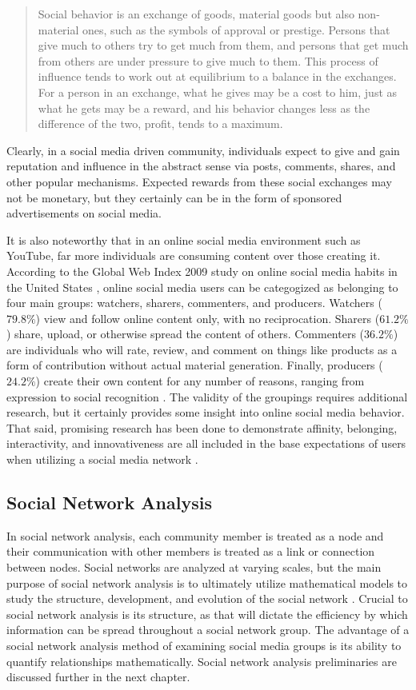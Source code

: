 \begin{quote}
Social behavior is an exchange of goods, material goods but also non-material ones, such as the symbols of approval or prestige. Persons that give much to others try to get much from them, and persons that get much from others are under pressure to give much to them. This process of influence tends to work out at equilibrium to a balance in the exchanges. For a person in an exchange, what he gives may be a cost to him, just as what he gets may be a reward, and his behavior changes less as the difference of the two, profit, tends to a maximum.  \cite{homans1958social}
\end{quote}

Clearly, in a social media driven community, individuals expect to give and gain reputation and influence in the abstract sense via posts, comments, shares, and other popular mechanisms. Expected rewards from these social exchanges may not be monetary, but they certainly can be in the form of sponsored advertisements on social media. 

It is also noteworthy that in an online social media environment such as YouTube, far more individuals are consuming content over those creating it. According to the Global Web Index 2009 study on online social media habits in the United States \cite{trendstream2010}, online social media users can be categogized as belonging to four main groups: watchers, sharers, commenters, and producers. Watchers ($79.8\%$) view and follow online content only, with no reciprocation. Sharers ($61.2\%$) share, upload, or otherwise spread the content of others. Commenters ($36.2\%$) are individuals who will rate, review, and comment on things like products as a form of contribution without actual material generation. Finally, producers ($24.2\%$) create their own content for any number of reasons, ranging from expression to social recognition \cite{sigala2012social}. The validity of the groupings requires additional research, but it certainly provides some insight into online social media behavior. That said, promising research has been done to demonstrate affinity, belonging, interactivity, and innovativeness are all included in the base expectations of users when utilizing a social media network \cite{krishen2016generation}.

\subsection{Social Network Analysis}
In social network analysis, each community member is treated as a node and their communication with other members is treated as a link or connection between nodes. Social networks are analyzed at varying scales, but the main purpose of social network analysis is to ultimately utilize mathematical models to study the structure, development, and evolution of the social network \cite{wasserman1994social}. Crucial to social network analysis is its structure, as that will dictate the efficiency by which information can be spread throughout a social network group. The advantage of a social network analysis method of examining social media groups is its ability to quantify relationships mathematically. Social network analysis preliminaries are discussed further in the next chapter.

